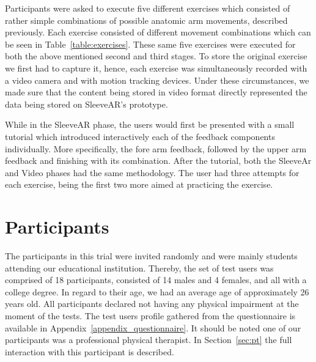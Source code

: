 Participants were asked to execute five different exercises which consisted of rather simple combinations of possible anatomic arm movements, described previously.
Each exercise consisted of different movement combinations which can be seen in Table~\ref{table:exercises}.
These same five exercises were executed for both the above mentioned second and third stages.
To store the original exercise we first had to capture it, hence, each exercise was simultaneously recorded with a video camera and with motion tracking devices. Under these circumstances, we made sure that the content being stored in video format directly represented the data being stored on SleeveAR's prototype.

While in the SleeveAR phase, the users would first be presented with a small tutorial which introduced interactively each of the feedback components individually. 
More specifically, the fore arm feedback, followed by the upper arm feedback and finishing with its combination.
After the tutorial, both the SleeveAr and Video phases had the same methodology. 
The user had three attempts for each exercise, being the first two more aimed at practicing the exercise.

\begin{table}[!t]
\centering
{}
\caption{Arm movements in exercises.}
\label{table:exercises}
\end{table}


\section{Participants} 


The participants in this trial were invited randomly and were mainly students attending our educational
institution. Thereby, the set of test users was comprised of 18 participants, consisted of 14 males and 4 females,
and all with a college degree. In regard to their age, we had an average age of approximately 26 years old. 
All participants declared not having any physical impairment at the moment of the tests. 
The test users profile gathered from the questionnaire is available in Appendix~\ref{appendix_questionnaire}.
It should be noted one of our participants was a professional physical therapist. 
In Section~\ref{sec:pt} the full interaction with this participant is described.


